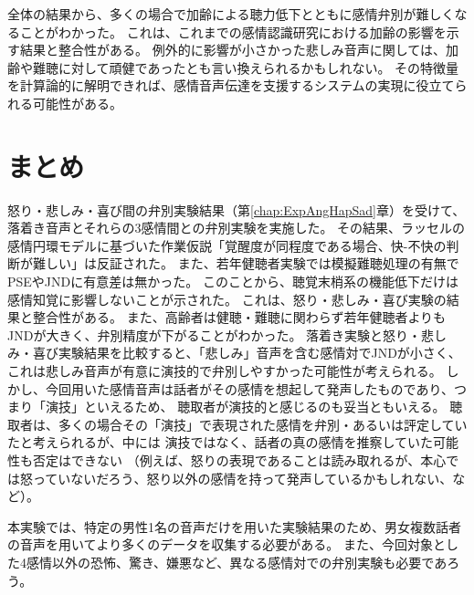 全体の結果から、多くの場合で加齢による聴力低下とともに感情弁別が難しくなることがわかった。
これは、これまでの感情認識研究における加齢の影響を示す結果と整合性がある。
例外的に影響が小さかった悲しみ音声に関しては、加齢や難聴に対して頑健であったとも言い換えられるかもしれない。
その特徴量を計算論的に解明できれば、感情音声伝達を支援するシステムの実現に役立てられる可能性がある。





\section{まとめ}
怒り・悲しみ・喜び間の弁別実験結果（第\ref{chap:ExpAngHapSad}章）を受けて、落着き音声とそれらの3感情間との弁別実験を実施した。
その結果、ラッセルの感情円環モデルに基づいた作業仮説「覚醒度が同程度である場合、快-不快の判断が難しい」は反証された。
また、若年健聴者実験では模擬難聴処理の有無でPSEやJNDに有意差は無かった。
このことから、聴覚末梢系の機能低下だけは感情知覚に影響しないことが示された。
これは、怒り・悲しみ・喜び実験の結果と整合性がある。
また、高齢者は健聴・難聴に関わらず若年健聴者よりもJNDが大きく、弁別精度が下がることがわかった。
落着き実験と怒り・悲しみ・喜び実験結果を比較すると、「悲しみ」音声を含む感情対でJNDが小さく、
これは悲しみ音声が有意に演技的で弁別しやすかった可能性が考えられる。
しかし、今回用いた感情音声は話者がその感情を想起して発声したものであり、つまり「演技」といえるため、
聴取者が演技的と感じるのも妥当ともいえる。
聴取者は、多くの場合その「演技」で表現された感情を弁別・あるいは評定していたと考えられるが、中には
演技ではなく、話者の真の感情を推察していた可能性も否定はできない
（例えば、怒りの表現であることは読み取れるが、本心では怒っていないだろう、怒り以外の感情を持って発声しているかもしれない、など）。


本実験では、特定の男性1名の音声だけを用いた実験結果のため、男女複数話者の音声を用いてより多くのデータを収集する必要がある。
また、今回対象とした4感情以外の恐怖、驚き、嫌悪など、異なる感情対での弁別実験も必要であろう。




  
